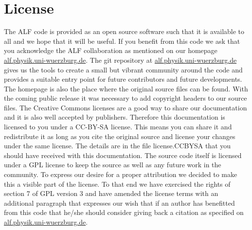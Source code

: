 
\section*{License}

The  ALF code  is provided as an open source software  such that it is  available  to all and we  hope that  it 
will be useful.  If you benefit from this code  we ask that you acknowledge  the ALF collaboration  as mentioned on our
homepage \url{alf.physik.uni-wuerzburg.de}.   The git repository at   \url{alf.physik.uni-wuerzburg.de} gives us the tools to 
create a small but vibrant community around the code and provides a suitable entry point for future contributors  and future developments. 
The homepage is also the place where the original source files can be found.
With the coming public release it was necessary to add copyright headers to our source files.
The Creative Commons licenses are a good way to share our documentation and it is also well 
accepted by publishers. Therefore this documentation is licensed to you under a CC-BY-SA license.
This means you can share it and redistribute it as long as you cite the original source and
license your changes under the same license. The details are in the file license.CCBYSA that you should have received with this documentation.
The source code itself is licensed under a GPL license to keep the source as well as any future work in the community.
To express our desire for a proper attribution we decided to make this a visible part of the license.
To that end we have exercised the rights of section 7 of GPL version 3 and have amended
the license terms with an additional paragraph that expresses our wish that if an author has benefitted from this code
that he/she should consider giving back a citation as specified on \url{alf.physik.uni-wuerzburg.de}.
